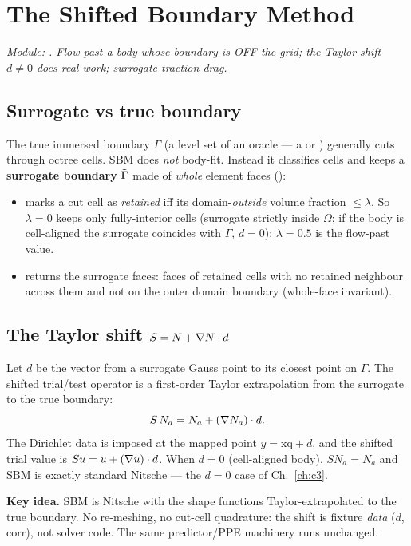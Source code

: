 \chapter{The Shifted Boundary Method}
\label{ch:c4}

\emph{Module: . Flow past a body whose
boundary is OFF the grid; the Taylor shift $d\neq0$ does real work;
surrogate-traction drag.}

\section{Surrogate vs true boundary}
The true immersed boundary $\Gamma$ (a level set of an oracle --- a
 or ) generally cuts through octree cells. SBM does
\emph{not} body-fit. Instead it classifies cells and keeps a
\textbf{surrogate boundary} $\tilde\Gamma$ made of \emph{whole} element faces
():
\begin{itemize}
\item {} marks a cut cell as
  \emph{retained} iff its domain-\emph{outside} volume fraction $\le\lambda$.
  So $\lambda=0$ keeps only fully-interior cells (surrogate strictly inside
  $\Omega$; if the body is cell-aligned the surrogate coincides with
  $\Gamma$, $d=0$); $\lambda=0.5$ is the flow-past value.
\item {} returns the surrogate faces: faces of
  retained cells with no retained neighbour across them and not on the outer
  domain boundary (whole-face invariant).
\end{itemize}

\section{The Taylor shift $S = N + \nabla N\cdot d$}
Let $d$ be the vector from a surrogate Gauss point to its closest point on
$\Gamma$. The shifted trial/test operator is a first-order Taylor
extrapolation from the surrogate to the true boundary:
\begin{equation}
S\,N_a = N_a + (\nabla N_a)\cdot d.
\end{equation}
The Dirichlet data is imposed at the mapped point $y=\text{xq}+d$, and the
shifted trial value is $Su = u + (\nabla u)\cdot d$. When $d=0$
(cell-aligned body), $S N_a = N_a$ and SBM is exactly standard Nitsche ---
the $d=0$ case of Ch.~\ref{ch:c3}.

\begin{keybox}\textbf{Key idea.} SBM is Nitsche with the shape functions
Taylor-extrapolated to the true boundary. No re-meshing, no cut-cell
quadrature: the shift is fixture \emph{data} ($d$, $\text{corr}$), not
solver code. The same predictor/PPE machinery runs
unchanged.\end{keybox}


